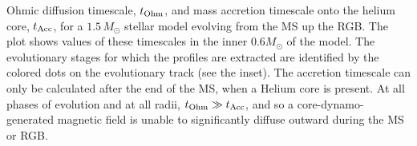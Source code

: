 \label{fig:timescales}
Ohmic diffusion timescale, $t_{\rm Ohm}$, and mass accretion timescale onto the helium core, $t_{\rm Acc}$, for a $1.5 \, M_\odot$ stellar model evolving from the MS up the RGB. The plot shows values of these timescales in the inner $0.6 M_\odot$ of the model. The evolutionary stages for which the profiles are extracted are identified by the colored dots on the evolutionary track (see the inset). The accretion timescale can only be calculated after the end of the MS, when a Helium core is present. At all phases of evolution and at all radii, $t_{\rm Ohm} \gg t_{\rm Acc}$, and so a core-dynamo-generated magnetic field is unable to significantly diffuse outward during the MS or RGB.
  